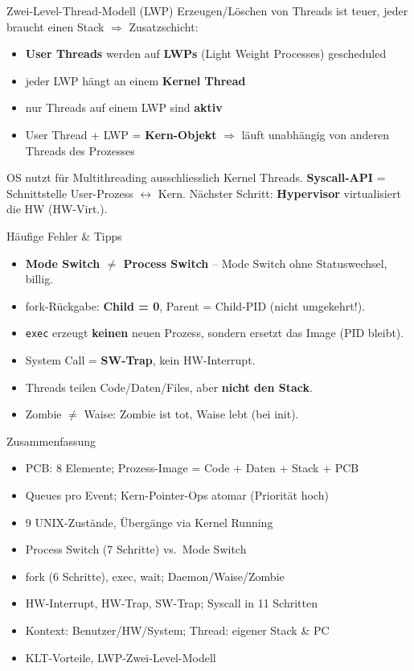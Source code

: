 \documentclass[a4paper, fontsize=7pt]{scrartcl}
\begin{document}
\begin{mainbox}{Zwei-Level-Thread-Modell (LWP)}
Erzeugen/Löschen von Threads ist teuer, jeder braucht einen Stack
$\Rightarrow$ Zusatzschicht:
\begin{itemize}
    \item \textbf{User Threads} werden auf \textbf{LWPs} (Light Weight
          Processes) gescheduled
    \item jeder LWP hängt an einem \textbf{Kernel Thread}
    \item nur Threads auf einem LWP sind \textbf{aktiv}
    \item User Thread + LWP = \textbf{Kern-Objekt} $\Rightarrow$ läuft
          unabhängig von anderen Threads des Prozesses
\end{itemize}
OS nutzt für Multithreading ausschliesslich Kernel Threads.
\textbf{Syscall-API} = Schnittstelle User-Prozess $\leftrightarrow$ Kern.
Nächster Schritt: \textbf{Hypervisor} virtualisiert die HW (HW-Virt.).
\end{mainbox}

\begin{subbox}{Häufige Fehler \& Tipps}
\begin{itemize}
    \item \textbf{Mode Switch $\neq$ Process Switch} -- Mode Switch ohne
          Statuswechsel, billig.
    \item fork-Rückgabe: \textbf{Child = 0}, Parent = Child-PID (nicht
          umgekehrt!).
    \item \texttt{exec} erzeugt \textbf{keinen} neuen Prozess, sondern
          ersetzt das Image (PID bleibt).
    \item System Call = \textbf{SW-Trap}, kein HW-Interrupt.
    \item Threads teilen Code/Daten/Files, aber \textbf{nicht den Stack}.
    \item Zombie $\neq$ Waise: Zombie ist tot, Waise lebt (bei init).
\end{itemize}
\end{subbox}

\begin{subbox}{Zusammenfassung}
\begin{itemize}
    \item PCB: 8 Elemente; Prozess-Image = Code + Daten + Stack + PCB
    \item Queues pro Event; Kern-Pointer-Ops atomar (Priorität hoch)
    \item 9 UNIX-Zustände, Übergänge via Kernel Running
    \item Process Switch (7 Schritte) vs.\ Mode Switch
    \item fork (6 Schritte), exec, wait; Daemon/Waise/Zombie
    \item HW-Interrupt, HW-Trap, SW-Trap; Syscall in 11 Schritten
    \item Kontext: Benutzer/HW/System; Thread: eigener Stack \& PC
    \item KLT-Vorteile, LWP-Zwei-Level-Modell
\end{itemize}
\end{subbox}
\end{document}
